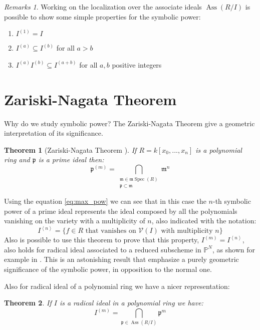 \documentclass[a4wide]{book}
\theoremstyle{plain}
\newtheorem{teo}{Theorem}[section]
\theoremstyle{remark}
\newtheorem{rems}[rem]{Remarks}
\theoremstyle{definition}
\newcommand{\PP}{\mathbb{P}}
\newcommand{\p}{\mathfrak{p}}
\newcommand{\mm}{\mathfrak{m}}
\DeclareMathOperator{\Ass}{Ass}
\DeclareMathOperator{\Spec}{Spec}
\begin{document}
\begin{rems} \label{rem:symb_basic}
Working on the localization over the associate ideals $ \Ass(R/I) $ is possible to show some simple properties for the symbolic power:
\begin{enumerate}
\item $ I^{(1)}=I $
\item $ I^{(a)} \subseteq I^{(b)} $ for all $ a > b $
\item $ I^{(a)}I^{(b)}\subseteq I^{(a+b)} $ for all $ a,b $ positive integers
\end{enumerate}
\end{rems}



\section{Zariski-Nagata Theorem}
Why do we study symbolic power? The Zariski-Nagata Theorem give a geometric interpretation of its significance.

\begin{teo}[Zariski-Nagata Theorem \cite{Zar49, Nagata62}] \label{teo:zarnaga}
	If $ R = k[x_0 , ... , x_n] $ is a polynomial ring and $ \p $ is a prime ideal then:
	\begin{equation}\label{eq:zar_nag_teo}
	\p^{(m)} = \bigcap_{\substack{ \mm \in \mm\Spec (R)\\ \p \subset \mm}} \mm ^n
	\end{equation}
\end{teo}

Using the equation \ref{eq:max_pow} we can see that in this case the $ n $-th symbolic power of a prime ideal represents the ideal composed by all the polynomials vanishing on the variety with a multiplicity of $ n $, also indicated with the notation:
\begin{equation}\label{eq:ideal_vanish}
	I^{\left<n\right>} = \{ f \in R \text{ that vanishes on } \mathcal{V}(I) \text{ with multiplicity } n\}
\end{equation}
Also is possible to use this theorem to prove that this property, $ I^{(m)} = I^{\left<n\right>} $, also holds for radical ideal associated to a reduced subscheme in $ \PP ^N $, as shown for example in \cite[Corollary 2.9]{Sid09}.
This is an astonishing result that emphasize a purely geometric significance of the symbolic power, in opposition to the normal one. 

Also for radical ideal of a polynomial ring we have a nicer representation:
\begin{teo}\label{teo:sym_radical}
If $ I $ is a radical ideal in a polynomial ring we have:
\begin{equation}
		I^{(m)} = \bigcap_{\p \in \Ass(R/I) } \p^m
	\end{equation}
\end{teo}
\end{document}
